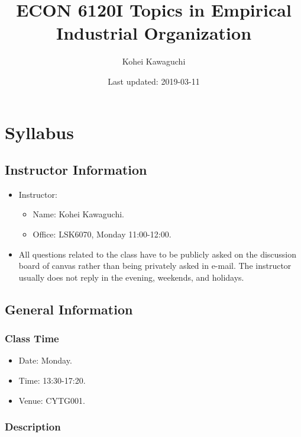 \documentclass[]{book}
\title{ECON 6120I Topics in Empirical Industrial Organization}
\author{Kohei Kawaguchi}
\date{Last updated: 2019-03-11}
\providecommand{\tightlist}{%
  \setlength{\itemsep}{0pt}\setlength{\parskip}{0pt}}
\begin{document}
\maketitle

{
\setcounter{tocdepth}{1}
\tableofcontents
}
\chapter{Syllabus}\label{syllabus}

\section{Instructor Information}\label{instructor-information}

\begin{itemize}
\tightlist
\item
  Instructor:

  \begin{itemize}
  \tightlist
  \item
    Name: Kohei Kawaguchi.
  \item
    Office: LSK6070, Monday 11:00-12:00.
  \end{itemize}
\item
  All questions related to the class have to be publicly asked on the
  discussion board of canvas rather than being privately asked in
  e-mail. The instructor usually does not reply in the evening,
  weekends, and holidays.
\end{itemize}

\section{General Information}\label{general-information}

\subsection{Class Time}\label{class-time}

\begin{itemize}
\tightlist
\item
  Date: Monday.
\item
  Time: 13:30-17:20.
\item
  Venue: CYTG001.
\end{itemize}

\subsection{Description}\label{description}
\end{document}
